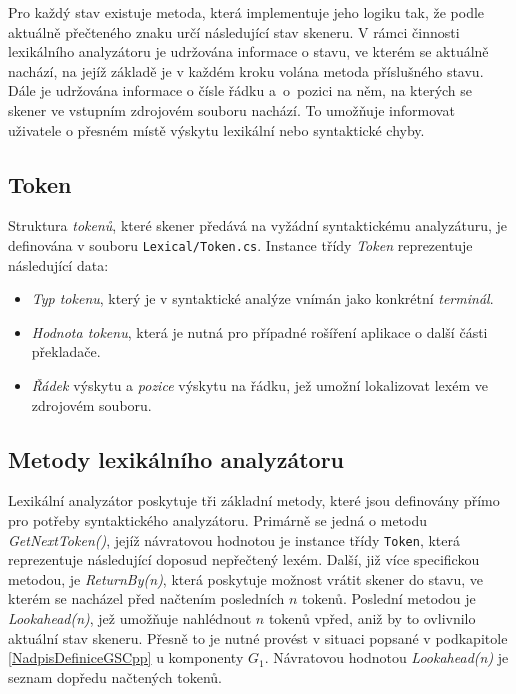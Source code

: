 Pro každý stav existuje metoda, která implementuje jeho logiku tak, že podle aktuálně přečteného znaku určí následující stav skeneru. V rámci činnosti lexikálního analyzátoru
je udržována informace o stavu, ve kterém se aktuálně nachází, na jejíž základě je v každém kroku volána metoda příslušného stavu. Dále je udržována informace o čísle řádku
a~o~pozici na něm, na kterých se skener ve vstupním zdrojovém souboru nachází. To umožňuje informovat uživatele o přesném místě výskytu lexikální nebo syntaktické chyby.

\subsection*{Token}
Struktura \emph{tokenů}, které skener předává na vyžádní syntaktickému analyzáturu, je definována v souboru \verb|Lexical/Token.cs|. Instance třídy \emph{Token} reprezentuje
následující data:
\begin{itemize}
  \item \emph{Typ tokenu}, který je v syntaktické analýze vnímán jako konkrétní \emph{terminál}.
  \item \emph{Hodnota tokenu}, která je nutná pro případné rošíření aplikace o další části překladače.
  \item \emph{Řádek} výskytu a \emph{pozice} výskytu na řádku, jež umožní lokalizovat lexém ve zdrojovém souboru.
\end{itemize}

\subsection*{Metody lexikálního analyzátoru}
Lexikální analyzátor poskytuje tři základní metody, které jsou definovány přímo pro potřeby syntaktického analyzátoru. Primárně se jedná o metodu \emph{GetNextToken()},
jejíž návratovou hodnotou je instance třídy \verb|Token|, která reprezentuje následující doposud nepřečtený lexém. Další, již více specifickou metodou, je \emph{ReturnBy(n)},
která poskytuje možnost vrátit skener do stavu, ve kterém se nacházel před načtením posledních $n$ tokenů. Poslední metodou je \emph{Lookahead(n)}, jež umožňuje nahlédnout $n$
tokenů vpřed, aniž by to ovlivnilo aktuální stav skeneru. Přesně to je nutné provést v situaci popsané v podkapitole \ref{NadpisDefiniceGSCpp} u komponenty $G_1$.
Návratovou hodnotou \emph{Lookahead(n)} je seznam dopředu načtených tokenů.

